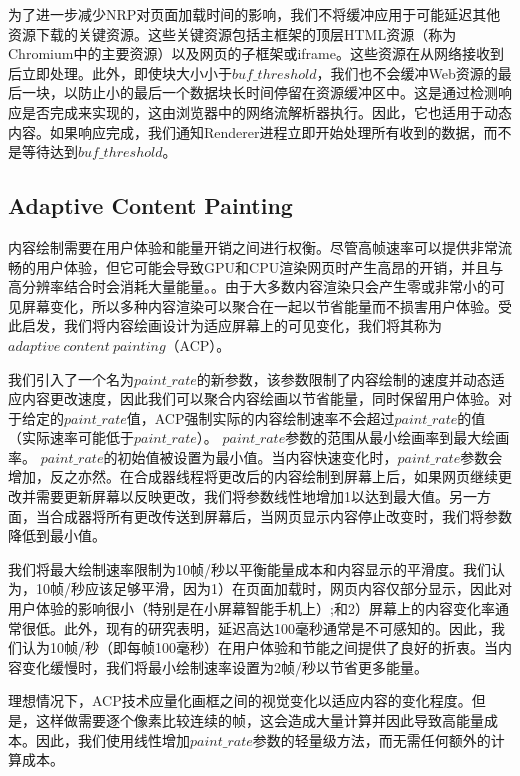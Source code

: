 \documentclass{sig-alternate-05-2015}
\begin{document}
为了进一步减少NRP对页面加载时间的影响，我们不将缓冲应用于可能延迟其他资源下载的关键资源。这些关键资源包括主框架的顶层HTML资源（称为Chromium中的主要资源）以及网页的子框架或iframe。这些资源在从网络接收到后立即处理。此外，即使块大小小于$buf\_threshold$，我们也不会缓冲Web资源的最后一块，以防止小的最后一个数据块长时间停留在资源缓冲区中。这是通过检测响应是否完成来实现的，这由浏览器中的网络流解析器执行。因此，它也适用于动态内容。如果响应完成，我们通知Renderer进程立即开始处理所有收到的数据，而不是等待达到$buf\_threshold$。

\subsection{Adaptive Content Painting}

内容绘制需要在用户体验和能量开销之间进行权衡。尽管高帧速率可以提供非常流畅的用户体验，但它可能会导致GPU和CPU渲染网页时产生高昂的开销，并且与高分辨率结合时会消耗大量能量\cite{12}。。由于大多数内容渲染只会产生零或非常小的可见屏幕变化，所以多种内容渲染可以聚合在一起以节省能量而不损害用户体验。受此启发，我们将内容绘画设计为适应屏幕上的可见变化，我们将其称为$adaptive\ content\ painting$（ACP）\cite{1}。

我们引入了一个名为$paint\_rate$的新参数，该参数限制了内容绘制的速度并动态适应内容更改速度，因此我们可以聚合内容绘画以节省能量，同时保留用户体验。对于给定的$paint\_rate$值，ACP强制实际的内容绘制速率不会超过$paint\_rate$的值（实际速率可能低于$paint\_rate$）。 $paint\_rate$参数的范围从最小绘画率到最大绘画率。 $paint\_rate$的初始值被设置为最小值。当内容快速变化时，$paint\_rate$参数会增加，反之亦然。在合成器线程将更改后的内容绘制到屏幕上后，如果网页继续更改并需要更新屏幕以反映更改，我们将参数线性地增加1以达到最大值。另一方面，当合成器将所有更改传送到屏幕后，当网页显示内容停止改变时，我们将参数降低到最小值。

我们将最大绘制速率限制为10帧/秒以平衡能量成本和内容显示的平滑度。我们认为，10帧/秒应该足够平滑，因为1）在页面加载时，网页内容仅部分显示，因此对用户体验的影响很小（特别是在小屏幕智能手机上）;和2）屏幕上的内容变化率通常很低。此外，现有的研究\cite{39}表明，延迟高达100毫秒通常是不可感知的。因此，我们认为10帧/秒（即每帧100毫秒）在用户体验和节能之间提供了良好的折衷。当内容变化缓慢时，我们将最小绘制速率设置为2帧/秒以节省更多能量。

理想情况下，ACP技术应量化画框之间的视觉变化以适应内容的变化程度。但是，这样做需要逐个像素比较连续的帧，这会造成大量计算并因此导致高能量成本。因此，我们使用线性增加$paint\_rate$参数的轻量级方法，而无需任何额外的计算成本。
\end{document}
